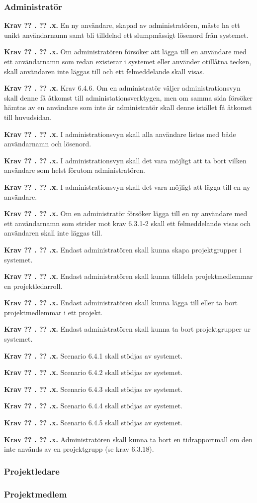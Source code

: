 \documentclass[a4paper]{article}
\newcommand\getcurrentref[1]{%
 \ifnumequal{\value{#1}}{0}
  {??}
  {\the\value{#1}}%
}
\newcommand\requirement[2]{
	\numberedrow{Krav}{#1}{#2}
}
\newcommand\numberedrow[3]{
	\noindent
	\textbf{#1 \getcurrentref{section}.\getcurrentref{subsection}.#2.} #3
	
}
\begin{document}
		\subsubsection*{Administratör}
			\requirement{x}{En ny användare, skapad av administratören, måste ha ett unikt användarnamn samt bli tilldelad ett slumpmässigt lösenord från systemet.}
			\requirement{x}{Om administratören försöker att lägga till en användare med ett användarnamn som redan existerar i systemet eller använder otillåtna tecken, skall användaren inte läggas till och ett felmeddelande skall visas.}
			\requirement{x}{Krav 6.4.6. Om en administratör väljer administrationsvyn skall denne få åtkomst till administationsverktygen, men om samma sida försöker hämtas av en användare som inte är administratör skall denne istället få åtkomst till huvudsidan.}
			\requirement{x}{I administrationsvyn skall alla användare listas med både användarnamn och lösenord.}
			\requirement{x}{I administrationsvyn skall det vara möjligt att ta bort vilken användare som helst förutom administratören.}
			\requirement{x}{I administrationsvyn skall det vara möjligt att lägga till en ny användare.}
			\requirement{x}{Om en administratör försöker lägga till en ny användare med ett användarnamn som strider mot krav 6.3.1-2 skall ett felmeddelande visas och användaren skall inte läggas till.}
			\requirement{x}{Endast administratören skall kunna skapa projektgrupper i systemet.}
			\requirement{x}{Endast administratören skall kunna tilldela projektmedlemmar en projektledarroll.}
			\requirement{x}{Endast administratören skall kunna lägga till eller ta bort projektmedlemmar i ett projekt. }
			\requirement{x}{Endast administratören skall kunna ta bort projektgrupper ur systemet.}
			\requirement{x}{Scenario 6.4.1 skall stödjas av systemet.}
			\requirement{x}{Scenario 6.4.2 skall stödjas av systemet.}
			\requirement{x}{Scenario 6.4.3 skall stödjas av systemet.}
			\requirement{x}{Scenario 6.4.4 skall stödjas av systemet.}
			\requirement{x}{Scenario 6.4.5 skall stödjas av systemet.}
			\requirement{x}{Administratören skall kunna ta bort en tidrapportmall om den inte används av en projektgrupp (se krav 6.3.18).}

		\subsubsection*{Projektledare}
		\subsubsection*{Projektmedlem}
\end{document}

